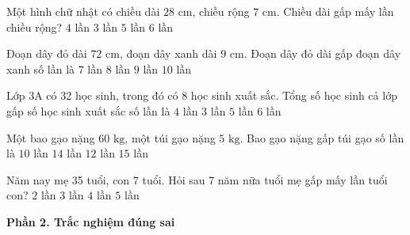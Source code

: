 \begin{ex} %
Một hình chữ nhật có chiều dài $28\text{ cm}$, chiều rộng $7\text{ cm}$. Chiều dài gấp mấy lần chiều rộng?
\choice
{\True $4$ lần}
{$3$ lần}
{$5$ lần}
{$6$ lần}
\end{ex}

\begin{ex} %
Đoạn dây đỏ dài $72\text{ cm}$, đoạn dây xanh dài $9\text{ cm}$. Đoạn dây đỏ dài gấp đoạn dây xanh số lần là
\choice
{$7$ lần}
{\True $8$ lần}
{$9$ lần}
{$10$ lần}
\end{ex}

\begin{ex} %
Lớp 3A có 32 học sinh, trong đó có 8 học sinh xuất sắc. Tổng số học sinh cả lớp gấp số học sinh xuất sắc số lần là
\choice
{\True $4$ lần}
{$3$ lần}
{$5$ lần}
{$6$ lần}
\end{ex}

\begin{ex} %
Một bao gạo nặng $60\text{ kg}$, một túi gạo nặng $5\text{ kg}$. Bao gạo nặng gấp túi gạo số lần là
\choice
{$10$ lần}
{$14$ lần}
{\True $12$ lần}
{$15$ lần}
\end{ex}

\begin{ex} %
Năm nay mẹ 35 tuổi, con 7 tuổi. Hỏi sau 7 năm nữa tuổi mẹ gấp mấy lần tuổi con?
\choice
{$2$ lần}
{\True $3$ lần}
{$4$ lần}
{$5$ lần}
\end{ex}

\textbf{Phần 2. Trắc nghiệm đúng sai}

